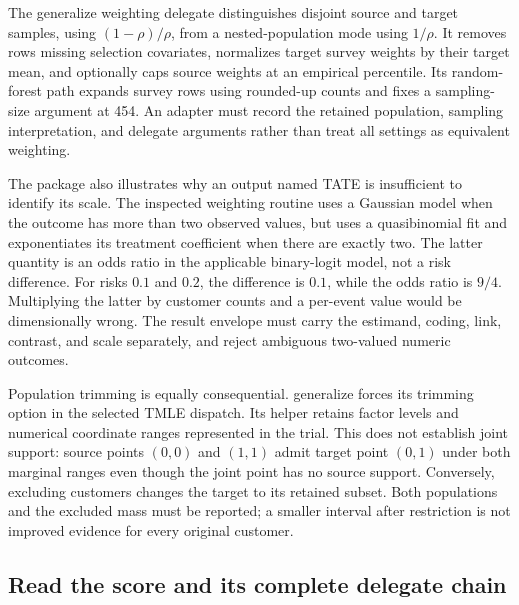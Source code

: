 The generalize weighting delegate distinguishes disjoint source and target samples, using $(1-\rho)/\rho$, from a nested-population mode using $1/\rho$. It removes rows missing selection covariates, normalizes target survey weights by their target mean, and optionally caps source weights at an empirical percentile. Its random-forest path expands survey rows using rounded-up counts and fixes a sampling-size argument at 454. An adapter must record the retained population, sampling interpretation, and delegate arguments rather than treat all settings as equivalent weighting.~\citep{exec25_rtm_generalize}

The package also illustrates why an output named TATE is insufficient to identify its scale. The inspected weighting routine uses a Gaussian model when the outcome has more than two observed values, but uses a quasibinomial fit and exponentiates its treatment coefficient when there are exactly two. The latter quantity is an odds ratio in the applicable binary-logit model, not a risk difference. For risks $0.1$ and $0.2$, the difference is $0.1$, while the odds ratio is $9/4$. Multiplying the latter by customer counts and a per-event value would be dimensionally wrong. The result envelope must carry the estimand, coding, link, contrast, and scale separately, and reject ambiguous two-valued numeric outcomes.~\citep{exec25_rtm_generalize,exec25_rtm_choice}

Population trimming is equally consequential. generalize forces its trimming option in the selected TMLE dispatch. Its helper retains factor levels and numerical coordinate ranges represented in the trial. This does not establish joint support: source points $(0,0)$ and $(1,1)$ admit target point $(0,1)$ under both marginal ranges even though the joint point has no source support. Conversely, excluding customers changes the target to its retained subset. Both populations and the excluded mass must be reported; a smaller interval after restriction is not improved evidence for every original customer.~\citep{exec25_rtm_generalize,exec25_rtm_choice}

\subsection{Read the score and its complete delegate chain}


